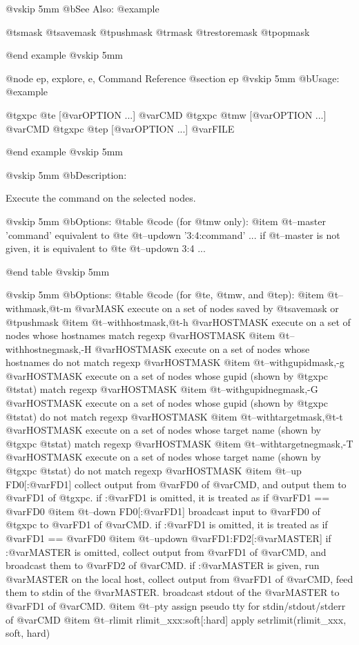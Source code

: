 @vskip 5mm
@b{See Also:}
@example

  @t{smask} @t{savemask} @t{pushmask} @t{rmask} @t{restoremask} @t{popmask}

@end example
@vskip 5mm

@node ep, explore, e, Command Reference
@section ep
@vskip 5mm
@b{Usage:}
@example

  @t{gxpc} @t{e}  [@var{OPTION} ...] @var{CMD}
  @t{gxpc} @t{mw} [@var{OPTION} ...] @var{CMD}
  @t{gxpc} @t{ep} [@var{OPTION} ...] @var{FILE}

@end example
@vskip 5mm

@vskip 5mm
@b{Description:}


  Execute the command on the selected nodes.

@vskip 5mm
@b{Options: }
@table @code
(for @t{mw} only):
@item   @t{--master} 'command'
    equivalent to @t{e} @t{--updown} '3:4:command' ...
  if @t{--master} is not given, it is equivalent to @t{e} @t{--updown} 3:4 ...

@end table
@vskip 5mm

@vskip 5mm
@b{Options: }
@table @code
(for @t{e}, @t{mw}, and @t{ep}):
@item   @t{--withmask},@t{-m} @var{MASK}
    execute on a set of nodes saved by @t{savemask} or @t{pushmask}
@item   @t{--withhostmask},@t{-h} @var{HOSTMASK}
    execute on a set of nodes whose hostnames match regexp @var{HOSTMASK}
@item   @t{--withhostnegmask},-H @var{HOSTMASK}
    execute on a set of nodes whose hostnames do not match regexp @var{HOSTMASK}
@item   @t{--withgupidmask},-g @var{HOSTMASK}
    execute on a set of nodes whose gupid (shown by @t{gxpc} @t{stat}) 
    match regexp @var{HOSTMASK}
@item   @t{--withgupidnegmask},-G @var{HOSTMASK}
    execute on a set of nodes whose gupid (shown by @t{gxpc} @t{stat}) 
    do not match regexp @var{HOSTMASK}
@item   @t{--withtargetmask},@t{-t} @var{HOSTMASK}
    execute on a set of nodes whose target name (shown by @t{gxpc} @t{stat}) 
    match regexp @var{HOSTMASK}
@item   @t{--withtargetnegmask},-T @var{HOSTMASK}
    execute on a set of nodes whose target name (shown by @t{gxpc} @t{stat}) 
    do not match regexp @var{HOSTMASK}
@item   @t{--up} FD0[:@var{FD1}]
    collect output from @var{FD0} of @var{CMD}, and output them to @var{FD1} of @t{gxpc}.
    if :@var{FD1} is omitted, it is treated as if @var{FD1} == @var{FD0}
@item   @t{--down} FD0[:@var{FD1}]
    broadcast input to @var{FD0} of @t{gxpc} to @var{FD1} of @var{CMD}.
    if :@var{FD1} is omitted, it is treated as if @var{FD1} == @var{FD0}
@item   @t{--updown} @var{FD1}:FD2[:@var{MASTER}]
    if :@var{MASTER} is omitted, collect output from @var{FD1} of @var{CMD},
    and broadcast them to @var{FD2} of @var{CMD}.
    if :@var{MASTER} is given, run @var{MASTER} on the local host, collect
    output from @var{FD1} of @var{CMD}, feed them to stdin of the @var{MASTER}.
    broadcast stdout of the @var{MASTER} to @var{FD1} of @var{CMD}.
@item   @t{--pty}
    assign pseudo tty for stdin/stdout/stderr of @var{CMD}
@item   @t{--rlimit} rlimit_xxx:soft[:hard]
    apply setrlimit(rlimit_xxx, soft, hard)

